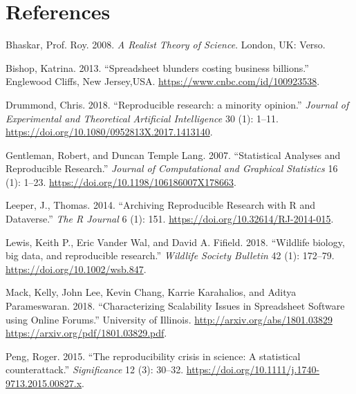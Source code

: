\documentclass[smallextended]{svjour3}       %
\newlength{\cslhangindent}
\newlength{\cslentryspacingunit} %
\newenvironment{CSLReferences}[2] %
 {%
  \setlength{\parindent}{0pt}
  \ifodd #1
  \let\oldpar\par
  \def\par{\hangindent=\cslhangindent\oldpar}
  \fi
  \setlength{\parskip}{#2\cslentryspacingunit}
 }%
 {}
\begin{document}
\hypertarget{references}{%
\section*{References}\label{references}}

\hypertarget{refs}{}
\begin{CSLReferences}{1}{0}
\leavevmode{}%
Bhaskar, Prof. Roy. 2008. \emph{{A Realist Theory of Science}}. London, UK: Verso.

\leavevmode{}%
Bishop, Katrina. 2013. {``{Spreadsheet blunders costing business billions}.''} Englewood Cliffs, New Jersey,USA. \url{https://www.cnbc.com/id/100923538}.

\leavevmode{}%
Drummond, Chris. 2018. {``{Reproducible research: a minority opinion}.''} \emph{Journal of Experimental and Theoretical Artificial Intelligence} 30 (1): 1--11. \url{https://doi.org/10.1080/0952813X.2017.1413140}.

\leavevmode{}%
Gentleman, Robert, and Duncan Temple Lang. 2007. {``{Statistical Analyses and Reproducible Research}.''} \emph{Journal of Computational and Graphical Statistics} 16 (1): 1--23. \url{https://doi.org/10.1198/106186007X178663}.

\leavevmode{}%
Leeper, J., Thomas. 2014. {``{Archiving Reproducible Research with R and Dataverse}.''} \emph{The R Journal} 6 (1): 151. \url{https://doi.org/10.32614/RJ-2014-015}.

\leavevmode{}%
Lewis, Keith P., Eric Vander Wal, and David A. Fifield. 2018. {``{Wildlife biology, big data, and reproducible research}.''} \emph{Wildlife Society Bulletin} 42 (1): 172--79. \url{https://doi.org/10.1002/wsb.847}.

\leavevmode{}%
Mack, Kelly, John Lee, Kevin Chang, Karrie Karahalios, and Aditya Parameswaran. 2018. {``{Characterizing Scalability Issues in Spreadsheet Software using Online Forums}.''} University of Illinois. \href{http://arxiv.org/abs/1801.03829\%20https://arxiv.org/pdf/1801.03829.pdf}{http://arxiv.org/abs/1801.03829 https://arxiv.org/pdf/1801.03829.pdf}.

\leavevmode{}%
Peng, Roger. 2015. {``{The reproducibility crisis in science: A statistical counterattack}.''} \emph{Significance} 12 (3): 30--32. \url{https://doi.org/10.1111/j.1740-9713.2015.00827.x}.


\end{CSLReferences}
\end{document}
